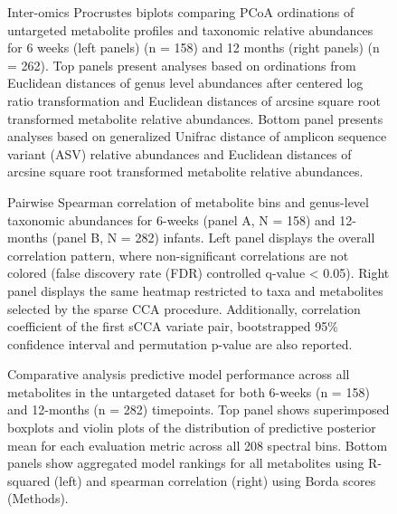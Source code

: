 \begin{figure}
    \centering
    \caption[Inter-omics Procrustes biplots comparing PCoA ordinations of untargeted metabolite profiles and taxonomic relative abundances for 6 weeks (left panels) (n = 158) and 12 months (right panels) (n = 262).]{Inter-omics Procrustes biplots comparing PCoA ordinations of untargeted metabolite profiles and taxonomic relative abundances for 6 weeks (left panels) (n = 158) and 12 months (right panels) (n = 262). Top panels present analyses based on ordinations from Euclidean distances of genus level abundances after centered log ratio transformation and Euclidean distances of arcsine square root transformed metabolite relative abundances. Bottom panel presents analyses based on generalized Unifrac distance of amplicon sequence variant (ASV) relative abundances and Euclidean distances of arcsine square root transformed metabolite relative abundances.}
    \label{fig:b1}
\end{figure}

\begin{figure}
    \centering
    \caption[Pairwise Spearman correlation of metabolite bins and genus-level taxonomic abundances for 6-weeks (panel A, N = 158) and 12-months (panel B, N = 282) infants.]{Pairwise Spearman correlation of metabolite bins and genus-level taxonomic abundances for 6-weeks (panel A, N = 158) and 12-months (panel B, N = 282) infants. Left panel displays the overall correlation pattern, where non-significant correlations are not colored (false discovery rate (FDR) controlled q-value < 0.05). Right panel displays the same heatmap restricted to taxa and metabolites selected by the sparse CCA procedure. Additionally, correlation coefficient of the first sCCA variate pair, bootstrapped 95\% confidence interval and permutation p-value are also reported.}
    \label{fig:b2}
\end{figure}

\begin{figure}
    \centering
    \caption[Comparative analysis predictive model performance across all metabolites in the untargeted dataset for both 6-weeks (n = 158) and 12-months (n = 282) timepoints.]{Comparative analysis predictive model performance across all metabolites in the untargeted dataset for both 6-weeks (n = 158) and 12-months (n = 282) timepoints. Top panel shows superimposed boxplots and violin plots of the distribution of predictive posterior mean for each evaluation metric across all 208 spectral bins. Bottom panels show aggregated model rankings for all metabolites using R-squared (left) and spearman correlation (right) using Borda scores (Methods).}
    \label{fig:b3}
\end{figure}


